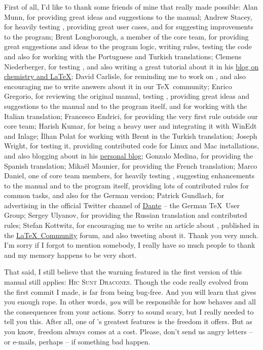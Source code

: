 \documentclass[a4paper,twoside,12pt]{memoir}
\begin{document}
First of all, I'd like to thank some friends of mine that really made \arara possible: Alan Munn, for providing
great ideas and suggestions to the manual; Andrew Stacey, for heavily testing \arara, providing great user
cases, and for suggesting improvements to the program; Brent Longborough, a member of the core team,
for providing great suggestions and ideas to the program logic, writing rules, testing the code and also for
working with the Portuguese and Turkish translations; Clemens Niederberger, for testing \arara, and also
writing a great tutorial about it in his
\href{http://www.mychemistry.eu/2012/06/arara-automate-latex-birds-music/}{blog on chemistry and \LaTeX};
David Carlisle, for reminding me to work on \arara, and also encouraging me to write answers about it in
our \TeX\ community; Enrico Gregorio, for reviewing the original manual, testing \arara, providing great
ideas and suggestions to the manual and to the program itself, and for working with the Italian translation;
Francesco Endrici, for providing the very first \arara rule outside our core team; Harish Kumar, for being a
heavy \arara user and integrating it with WinEdt and Inlage; \.Ilhan Polat for working with Brent in the Turkish
translation; Joseph Wright, for testing it, providing contributed code for Linux and Mac installations, and also
blogging about \arara in his \href{http://www.texdev.net}{personal blog}; Gonzalo Medina, for providing the
Spanish translation; Mikaël Maunier, for providing the French translation; Marco Daniel, one of core team
members, for heavily testing \arara, suggesting enhancements to the manual and to the program itself,
providing lots of contributed rules for common tasks, and also for the German version; Patrick Gundlach,
for advertising \arara in the official Twitter channel of \href{http://www.dante.de}{Dante} -- the German
\TeX\ User Group; Sergey Ulyanov, for providing the Russian translation and contributed rules; Stefan Kottwitz,
for encouraging me to write an article about \arara, published in the
\href{http://latex-community.org/know-how/435-gnuplot-arara}{\LaTeX\ Community} forum, and also
tweeting about it. Thank you very much. I'm sorry if I forgot to mention somebody, I really have so much
people to thank and my memory happens to be very short.

That said, I still believe that the warning featured in the first version of this manual still applies:
\textsc{Hic Sunt Dracones}. Though the code really evolved from the first commit I made, \arara is far from
being bug-free. And you will learn that \arara gives you enough rope. In other words, \emph{you} will be
responsible for how \arara behaves and all the consequences from your actions. Sorry to sound scary, but I
really needed to tell you this. After all, one of \arara's greatest features is the freedom it offers. But as you
know, freedom always comes at a cost. Please, don't send us angry letters -- or e-mails, perhaps -- if
something bad happen.
\end{document}
